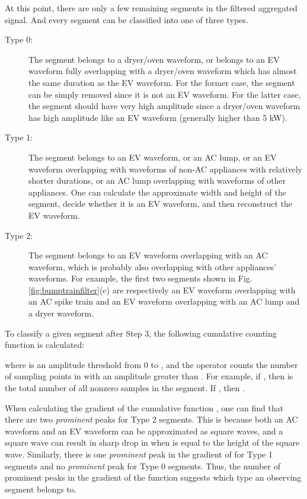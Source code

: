 \documentclass[conference]{IEEEtran}
\begin{document}
At this point, there are only a few remaining segments in the filtered aggregated signal. And every segment can be classified into one of three types.
\begin{description}
  \item[Type 0:] The segment belongs to a dryer/oven waveform, or belongs to an EV waveform fully overlapping with a dryer/oven waveform which has almost the same duration as the EV waveform. For the former case, the segment can be simply removed since it is not an EV waveform. For the latter case, the segment should have  very high amplitude since a dryer/oven waveform has  high amplitude like an EV waveform (generally higher than 5 kW).

  \item[Type 1:] The segment belongs to an EV waveform,  or an AC lump, or an EV waveform overlapping with waveforms of non-AC appliances with relatively shorter durations, or an AC lump overlapping with waveforms of other appliances. One can calculate the approximate width and height of the segment, decide whether it is an EV waveform,  and then reconstruct the EV waveform.

  \item[Type 2:] The segment belongs to an EV waveform overlapping with an AC waveform, which is probably also overlapping with other appliances' waveforms. For example, the first two segments shown in Fig.\ref{fig:bumptrainfilter}(c) are respectively an EV waveform overlapping with an AC spike train and an EV waveform overlapping with an AC lump and a dryer waveform.
\end{description}

To classify a given segment  after Step 3, the following cumulative counting function is calculated:

where  is an amplitude threshold from 0 to , and the operator  counts the number of sampling points in  with an amplitude greater than . For example, if , then  is the total number of all nonzero samples in the segment. If , then .

When calculating the gradient of the cumulative function , one can find that there are two \emph{prominent} peaks for Type 2 segments. This is because both an AC waveform and an EV waveform can be approximated as square waves, and a square wave can result in sharp drop in  when  is equal to the height of the square wave. Similarly, there is one \emph{prominent} peak in the gradient of  for Type 1 segments and no \emph{prominent} peak for Type 0 segments. Thus, the number of prominent peaks in the gradient of the function suggests which type an observing segment belongs to.
\end{document}
